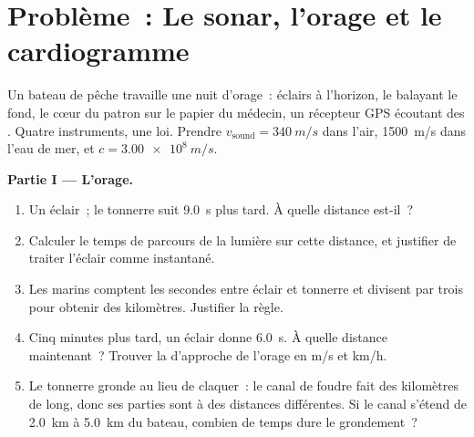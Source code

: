 \section{Problème~: Le sonar, l'orage et le cardiogramme}

\begin{problem}[{Problème du week-end --- lire les signaux du monde~:
une loi, $d = v\,t$, localise un orage, cartographie un fond, compte
un battement de cœur et tire au clair comment fonctionne le GPS}]
\label{pb:g10:signals-and-waves:1}
Un bateau de pêche travaille une nuit d'orage~: éclairs à l'horizon, le
 balayant le fond, le cœur du patron sur le papier du
médecin, un récepteur GPS écoutant des .
Quatre instruments, une loi. Prendre $v_{\text{sound}} = \qty{340}{m/s}$
dans l'air, \qty{1500}{m/s} dans l'eau de mer, et $c = \qty{3.00e8}{m/s}$.

\medskip
\noindent\textbf{Partie I --- L'orage.}
\begin{enumerate}
  \item Un éclair~; le tonnerre suit \qty{9.0}{s} plus tard. À quelle
        distance est-il~?
  \item Calculer le temps de parcours de la lumière sur cette distance,
        et justifier de traiter l'éclair comme instantané.
  \item Les marins comptent les secondes entre éclair et tonnerre et
        divisent par trois pour obtenir des kilomètres. Justifier la
        règle.
  \item Cinq minutes plus tard, un éclair donne \qty{6.0}{s}. À quelle
        distance maintenant~? Trouver la  d'approche de
        l'orage en \unit{m/s} et \unit{km/h}.
  \item Le tonnerre gronde au lieu de claquer~: le canal de foudre fait
        des kilomètres de long, donc ses parties sont à des distances
        différentes. Si le canal s'étend de \qty{2.0}{km} à
        \qty{5.0}{km} du bateau, combien de temps dure le grondement~?
\end{enumerate}


\end{problem}
